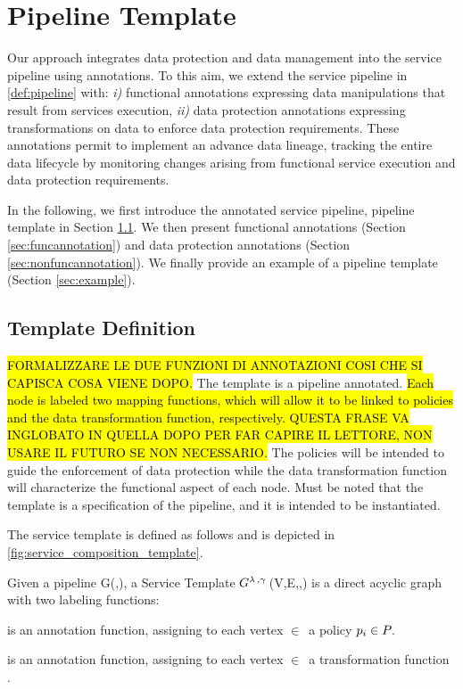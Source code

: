 \section{Pipeline Template}
Our approach integrates data protection and data management into the service pipeline using annotations.
To this aim, we extend the service pipeline in \cref{def:pipeline} with: \emph{i)} functional annotations expressing data manipulations that result from services execution, \emph{ii)} data protection annotations expressing transformations on data to enforce data protection requirements.
These annotations permit to implement an advance data lineage, tracking the entire data lifecycle by monitoring changes arising from functional service execution and data protection requirements.

In the following, we first introduce the annotated service pipeline, pipeline template in Section \ref{sec:templatedefinition}. We then present functional annotations (Section \ref{sec:funcannotation}) and data protection annotations (Section \ref{sec:nonfuncannotation}). We finally provide an example of a pipeline template (Section \ref{sec:example}).


\subsection{Template Definition}\label{sec:templatedefinition}
\hl{FORMALIZZARE LE DUE FUNZIONI DI ANNOTAZIONI COSI CHE SI CAPISCA COSA VIENE DOPO.} 
The template is a pipeline annotated.
\hl{Each node is labeled two mapping functions, which will allow it to be linked to policies and the data transformation function, respectively. QUESTA FRASE VA INGLOBATO IN QUELLA DOPO PER FAR CAPIRE IL LETTORE, NON USARE IL FUTURO SE NON NECESSARIO.}
The policies will be intended to guide the enforcement of data protection while the data transformation function will characterize the functional aspect of each node.
Must be noted that the template is a specification of the pipeline, and it is intended to be instantiated.

The service template is defined as follows and is depicted in \cref{fig:service_composition_template}.

\begin{definition} \label{def:pipeline}
  Given a pipeline G(\V,\E), a Service Template  $G^{\lambda\,,\gamma\,}$(V,E,\myLambda,\myGamma) is a direct acyclic graph with two labeling functions:
  \begin{enumerate*}[label=\roman*)]
    \item \myLambda is an annotation function, assigning to each vertex $\in$\V\ a policy $p_i\in P_{}$.
    \item \myGamma is an annotation function, assigning to each vertex $\in$\V\ a transformation function \F.
  \end{enumerate*}
\end{definition}

